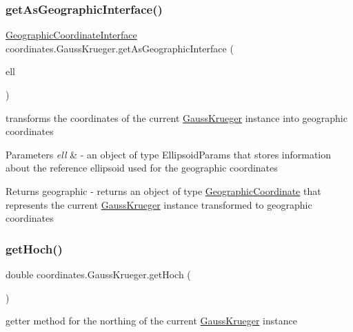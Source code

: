 \subsubsection{\texorpdfstring{get\+As\+Geographic\+Interface()}{getAsGeographicInterface()}}
{\footnotesize\ttfamily \hyperlink{classcoordinates_1_1_geographic_coordinate_interface}{Geographic\+Coordinate\+Interface} coordinates.\+Gauss\+Krueger.\+get\+As\+Geographic\+Interface (\begin{DoxyParamCaption}\item[{\hyperlink{classparams_1_1_ellipsoid_parms}{Ellipsoid\+Parms}}]{ell }\end{DoxyParamCaption})}



transforms the coordinates of the current \hyperlink{classcoordinates_1_1_gauss_krueger}{Gauss\+Krueger} instance into geographic coordinates 


\begin{DoxyParams}{Parameters}
{\em ell} & -\/ an object of type Ellipsoid\+Params that stores information about the reference ellipsoid used for the geographic coordinates \\
\hline
\end{DoxyParams}
\begin{DoxyReturn}{Returns}
geographic -\/ returns an object of type \hyperlink{classcoordinates_1_1_geographic_coordinate}{Geographic\+Coordinate} that represents the current \hyperlink{classcoordinates_1_1_gauss_krueger}{Gauss\+Krueger} instance transformed to geographic coordinates 
\end{DoxyReturn}
\mbox{\label{classcoordinates_1_1_gauss_krueger_ac6dfe7a78850b5aa7c69e1e5d2a0b3cf}} 
\subsubsection{\texorpdfstring{get\+Hoch()}{getHoch()}}
{\footnotesize\ttfamily double coordinates.\+Gauss\+Krueger.\+get\+Hoch (\begin{DoxyParamCaption}{ }\end{DoxyParamCaption})}



getter method for the northing of the current \hyperlink{classcoordinates_1_1_gauss_krueger}{Gauss\+Krueger} instance 

